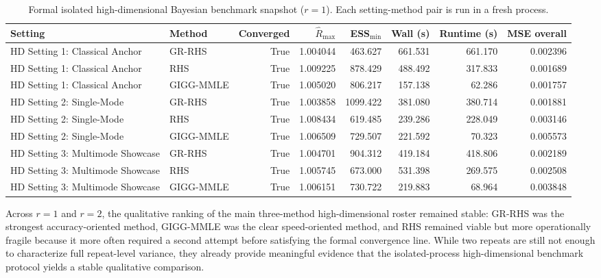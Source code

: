 \documentclass[11pt]{article}
\begin{document}
\begin{table}[H]
\centering
\caption{Formal isolated high-dimensional Bayesian benchmark snapshot
(\(r=1\)). Each setting-method pair is run in a fresh process.}
\label{tab:highdim-isolated-r1}
\begin{adjustbox}{max width=\textwidth}
\begin{tabular}{llrrrrrr}
\toprule
Setting & Method & Converged & \(\hat R_{\max}\) & ESS\(_{\min}\) & Wall (s) & Runtime (s) & MSE overall \\
\midrule
HD Setting 1: Classical Anchor & GR-RHS & True & 1.004044 & 463.627 & 661.531 & 661.170 & 0.002396 \\
HD Setting 1: Classical Anchor & RHS & True & 1.009225 & 878.429 & 488.492 & 317.833 & 0.001689 \\
HD Setting 1: Classical Anchor & GIGG-MMLE & True & 1.005020 & 806.217 & 157.138 & 62.286 & 0.001757 \\
\midrule
HD Setting 2: Single-Mode & GR-RHS & True & 1.003858 & 1099.422 & 381.080 & 380.714 & 0.001881 \\
HD Setting 2: Single-Mode & RHS & True & 1.008434 & 619.485 & 239.286 & 228.049 & 0.003146 \\
HD Setting 2: Single-Mode & GIGG-MMLE & True & 1.006509 & 729.507 & 221.592 & 70.323 & 0.005573 \\
\midrule
HD Setting 3: Multimode Showcase & GR-RHS & True & 1.004701 & 904.312 & 419.184 & 418.806 & 0.002189 \\
HD Setting 3: Multimode Showcase & RHS & True & 1.005745 & 673.000 & 531.398 & 269.575 & 0.002508 \\
HD Setting 3: Multimode Showcase & GIGG-MMLE & True & 1.006151 & 730.722 & 219.883 & 68.964 & 0.003848 \\
\bottomrule
\end{tabular}
\end{adjustbox}
\end{table}

Across \(r=1\) and \(r=2\), the qualitative ranking of the main three-method
high-dimensional roster remained stable: GR-RHS was the strongest
accuracy-oriented method, GIGG-MMLE was the clear speed-oriented method, and
RHS remained viable but more operationally fragile because it more often
required a second attempt before satisfying the formal convergence line. While
two repeats are still not enough to characterize full repeat-level variance,
they already provide meaningful evidence that the isolated-process
high-dimensional benchmark protocol yields a stable qualitative comparison.
\end{document}
